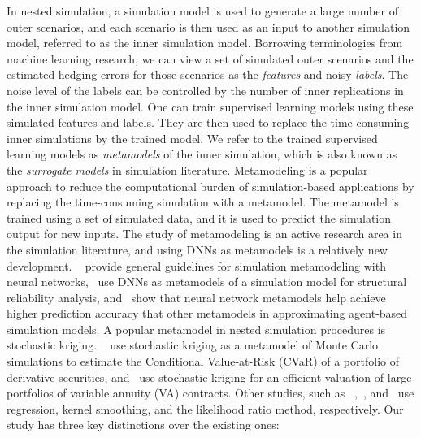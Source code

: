 In nested simulation, a simulation model is used to generate a large number of outer scenarios, and each scenario is then used as an input to another simulation model, referred to as the inner simulation model.
Borrowing terminologies from machine learning research, we can view a set of simulated outer scenarios and the estimated hedging errors for those scenarios as the \textit{features} and noisy \textit{labels}.
The noise level of the labels can be controlled by the number of inner replications in the inner simulation model.
One can train supervised learning models using these simulated features and labels.
They are then used to replace the time-consuming inner simulations by the trained model.
We refer to the trained supervised learning models as \textit{metamodels} of the inner simulation, which is also known as the \textit{surrogate models} in simulation literature.
Metamodeling is a popular approach to reduce the computational burden of simulation-based applications by replacing the time-consuming simulation with a metamodel.
The metamodel is trained using a set of simulated data, and it is used to predict the simulation output for new inputs.
The study of metamodeling is an active research area in the simulation literature, and using DNNs as metamodels is a relatively new development.
~\cite{fonseca2003simulation} provide general guidelines for simulation metamodeling with neural networks,~\cite{lieu2022adaptive} use DNNs as metamodels of a simulation model for structural reliability analysis, and~\cite{salle2014efficient} show that neural network metamodels help achieve higher prediction accuracy that other metamodels in approximating agent-based simulation models.
A popular metamodel in nested simulation procedures is stochastic kriging.
~\cite{liu2010stochastic} use stochastic kriging as a metamodel of Monte Carlo simulations to estimate the Conditional Value-at-Risk (CVaR) of a portfolio of derivative securities, and~\cite{gan2015valuation} use stochastic kriging for an efficient valuation of large portfolios of variable annuity (VA) contracts.
Other studies, such as ~\cite{broadie2015risk},~\cite{hong2017kernel}, and~\cite{zhang2022sample} use regression, kernel smoothing, and the likelihood ratio method, respectively.
Our study has three key distinctions over the existing ones:
